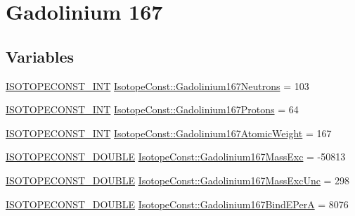 \hypertarget{group___isotope_const-_gadolinium-_gd167}{}\section{Gadolinium 167}
\label{group___isotope_const-_gadolinium-_gd167}
\subsection*{Variables}
\begin{DoxyCompactItemize}
\item 
\mbox{\hyperlink{group___isotope_const-_macros_ga5f18360b3e99483a35c32d789e62621c}{I\+S\+O\+T\+O\+P\+E\+C\+O\+N\+S\+T\+\_\+\+I\+NT}} \mbox{\hyperlink{group___isotope_const-_gadolinium-_gd167_gaa67dc3ba9465c7875e6dcbb3d844d507}{Isotope\+Const\+::\+Gadolinium167\+Neutrons}} = 103
\item 
\mbox{\hyperlink{group___isotope_const-_macros_ga5f18360b3e99483a35c32d789e62621c}{I\+S\+O\+T\+O\+P\+E\+C\+O\+N\+S\+T\+\_\+\+I\+NT}} \mbox{\hyperlink{group___isotope_const-_gadolinium-_gd167_ga035a29767f3f3d67ce2e3108e0233bf3}{Isotope\+Const\+::\+Gadolinium167\+Protons}} = 64
\item 
\mbox{\hyperlink{group___isotope_const-_macros_ga5f18360b3e99483a35c32d789e62621c}{I\+S\+O\+T\+O\+P\+E\+C\+O\+N\+S\+T\+\_\+\+I\+NT}} \mbox{\hyperlink{group___isotope_const-_gadolinium-_gd167_gaf8c94e1c0bc4484309518c79343f2445}{Isotope\+Const\+::\+Gadolinium167\+Atomic\+Weight}} = 167
\item 
\mbox{\hyperlink{group___isotope_const-_macros_ga8f45a7272ce02c0b4c65c44636ed719a}{I\+S\+O\+T\+O\+P\+E\+C\+O\+N\+S\+T\+\_\+\+D\+O\+U\+B\+LE}} \mbox{\hyperlink{group___isotope_const-_gadolinium-_gd167_gad25796d7a7152642cfdb6e6b78e253be}{Isotope\+Const\+::\+Gadolinium167\+Mass\+Exc}} = -\/50813
\item 
\mbox{\hyperlink{group___isotope_const-_macros_ga8f45a7272ce02c0b4c65c44636ed719a}{I\+S\+O\+T\+O\+P\+E\+C\+O\+N\+S\+T\+\_\+\+D\+O\+U\+B\+LE}} \mbox{\hyperlink{group___isotope_const-_gadolinium-_gd167_ga1fbe6e864d243f71addb985803371a71}{Isotope\+Const\+::\+Gadolinium167\+Mass\+Exc\+Unc}} = 298
\item 
\mbox{\hyperlink{group___isotope_const-_macros_ga8f45a7272ce02c0b4c65c44636ed719a}{I\+S\+O\+T\+O\+P\+E\+C\+O\+N\+S\+T\+\_\+\+D\+O\+U\+B\+LE}} \mbox{\hyperlink{group___isotope_const-_gadolinium-_gd167_gad90c89d5a1e7ee63de168ba147d6da30}{Isotope\+Const\+::\+Gadolinium167\+Bind\+E\+PerA}} = 8076
\item 

\end{DoxyCompactItemize}
